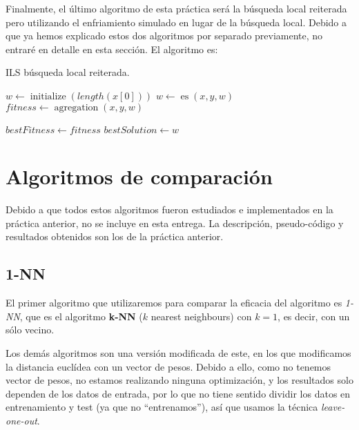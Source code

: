 \documentclass[11pt,a4paper]{article}
\begin{document}
Finalmente, el último algoritmo de esta práctica será la búsqueda local reiterada pero utilizando el enfriamiento simulado en lugar de la búsqueda local. Debido a que ya hemos explicado estos dos algoritmos por separado previamente, no entraré en detalle en esta sección. El algoritmo es: \\
\begin{algorithm}[H]
	\caption{{\sc ILS} búsqueda local reiterada.}
	
	$w \gets \operatorname{initialize}(length(x[0]))$ \;
	$w \gets \operatorname{es}(x, y, w)$ \;
	$fitness \gets \operatorname{agregation}(x, y, w)$ \;
	
	$bestFitness \gets fitness$ \;
	$bestSolution \gets w$ \;
	
	 \;
\end{algorithm}

\newpage
\section{Algoritmos de comparación}

Debido a que todos estos algoritmos fueron estudiados e implementados en la práctica anterior, no se incluye en esta entrega. La descripción, pseudo-código y resultados obtenidos son los de la práctica anterior.

\subsection{1-NN}

El primer algoritmo que utilizaremos para comparar la eficacia del algoritmo es \emph{1-NN}, que es el algoritmo \textbf{k-NN} ($k$ nearest neighbours) con $k = 1$, es decir, con un sólo vecino.

Los demás algoritmos son una versión modificada de este, en los que modificamos la distancia euclídea con un vector de pesos. Debido a ello, como no tenemos vector de pesos, no estamos realizando ninguna optimización, y los resultados solo dependen de los datos de entrada, por lo que no tiene sentido dividir los datos en entrenamiento y test (ya que no ``entrenamos''), así que usamos la técnica \emph{leave-one-out}.
\end{document}
